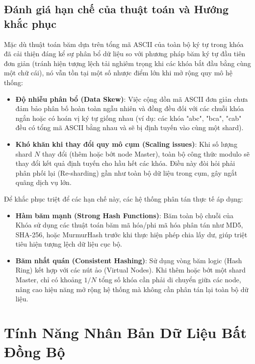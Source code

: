 \documentclass[12pt,a4paper]{report}
\begin{document}
\section{Đánh giá hạn chế của thuật toán và Hướng khắc phục}
Mặc dù thuật toán băm dựa trên tổng mã ASCII của toàn bộ ký tự trong khóa đã cải thiện đáng kể sự phân bổ dữ liệu so với phương pháp băm ký tự đầu tiên đơn giản (tránh hiện tượng lệch tải nghiêm trọng khi các khóa bắt đầu bằng cùng một chữ cái), nó vẫn tồn tại một số nhược điểm lớn khi mở rộng quy mô hệ thống:
\begin{itemize}
    \item \textbf{Độ nhiễu phân bổ (Data Skew)}: Việc cộng dồn mã ASCII đơn giản chưa đảm bảo phân bố hoàn toàn ngẫu nhiên và đồng đều đối với các chuỗi khóa ngắn hoặc có hoán vị ký tự giống nhau (ví dụ: các khóa "abc", "bca", "cab" đều có tổng mã ASCII bằng nhau và sẽ bị định tuyến vào cùng một shard).
    \item \textbf{Khó khăn khi thay đổi quy mô cụm (Scaling issues)}: Khi số lượng shard $N$ thay đổi (thêm hoặc bớt node Master), toàn bộ công thức modulo sẽ thay đổi kết quả định tuyến cho hầu hết các khóa. Điều này đòi hỏi phải phân phối lại (Re-sharding) gần như toàn bộ dữ liệu trong cụm, gây ngắt quãng dịch vụ lớn.
\end{itemize}

Để khắc phục triệt để các hạn chế này, các hệ thống phân tán thực tế áp dụng:
\begin{itemize}
    \item \textbf{Hàm băm mạnh (Strong Hash Functions)}: Băm toàn bộ chuỗi của Khóa sử dụng các thuật toán băm mã hóa/phi mã hóa phân tán như MD5, SHA-256, hoặc MurmurHash trước khi thực hiện phép chia lấy dư, giúp triệt tiêu hiện tượng lệch dữ liệu cục bộ.
    \item \textbf{Băm nhất quán (Consistent Hashing)}: Sử dụng vòng băm logic (Hash Ring) kết hợp với các nút ảo (Virtual Nodes). Khi thêm hoặc bớt một shard Master, chỉ có khoảng $1/N$ tổng số khóa cần phải di chuyển giữa các node, nâng cao hiệu năng mở rộng hệ thống mà không cần phân tán lại toàn bộ dữ liệu.
\end{itemize}

\newpage

\chapter{Tính Năng Nhân Bản Dữ Liệu Bất Đồng Bộ}
\end{document}
